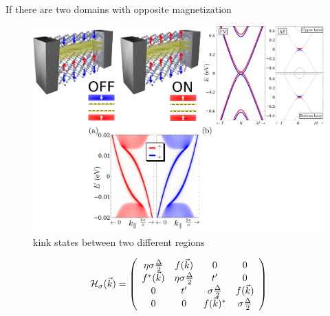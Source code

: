 
If there are two domains with opposite magnetization


\begin{figure}[h!]
\centering
\includegraphics{graphene_bilayer/figures/cri3_full.pdf}
\vspace{-5pt}
\caption{kink states between two different regions}
\label{cri32}
\end{figure}
\FloatBarrier


\begin{eqnarray}
{\cal H}_{\sigma}(\vec{k})=\left(
\begin{array}{cccc}
\eta\sigma \frac{\Delta}{2} & f(\vec{k}) & 0& 0 \\
f^*(\vec{k}) & \eta\sigma \frac{\Delta}{2} & t' & 0 \\
0 & t'  &  \sigma \frac{\Delta}{2} &  f(\vec{k})\\
 0 & 0 &  f(\vec{k})^* & \sigma \frac{\Delta}{2}
\end{array}
\right)
\label{hmodel}
\end{eqnarray}










